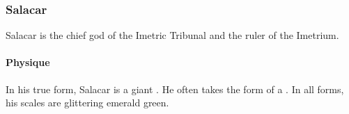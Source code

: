 \section{Salacar}
Salacar is the chief god of the Imetric Tribunal and the ruler of the Imetrium. 









\subsection{Physique}
In his true form, Salacar is a giant \nagalord. 
He often takes the form of a \scatha. 
In all forms, his scales are glittering emerald green. 































\part{\Resphain}























\chapter{\CiriathSepher}















